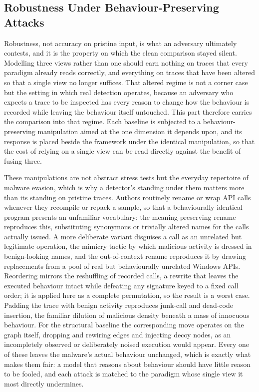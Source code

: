 \documentclass[%
    BCOR=10mm,
    DIV=13,
    toc=bibliography,
    toc=listof,
    oneside,
    12pt,
]{scrbook}
\begin{document}
\subsection{Robustness Under Behaviour-Preserving Attacks}
\label{subsec:baseline_failure_modes}

Robustness, not accuracy on pristine input, is what an adversary ultimately
contests, and it is the property on which the clean comparison stayed silent.
Modelling three views rather than one should earn nothing on traces that every
paradigm already reads correctly, and everything on traces that have been altered
so that a single view no longer suffices. That altered regime is not a corner case
but the setting in which real detection operates, because an adversary who expects
a trace to be inspected has every reason to change how the behaviour is recorded
while leaving the behaviour itself untouched. This part therefore carries the
comparison into that regime. Each baseline is subjected to a behaviour-preserving
manipulation aimed at the one
dimension it depends upon, and its response is placed beside the framework under
the identical manipulation, so that the cost of relying on a single view can be
read directly against the benefit of fusing three.

These manipulations are not abstract stress tests but the everyday repertoire of malware
evasion, which is why a detector's standing under them matters more than its
standing on pristine traces. Authors routinely rename or wrap API calls whenever
they recompile or repack a sample, so that a behaviourally identical program
presents an unfamiliar vocabulary; the meaning-preserving rename reproduces this,
substituting synonymous or trivially altered names for the calls actually issued.
A more deliberate variant disguises a call as an unrelated but legitimate
operation, the mimicry tactic by which malicious activity is dressed in
benign-looking names, and the out-of-context rename reproduces it by drawing
replacements from a pool of real but behaviourally unrelated Windows APIs.
Reordering mirrors the reshuffling of recorded calls, a rewrite that leaves the
executed behaviour intact while defeating any signature keyed to a fixed call
order; it is applied here as a complete permutation, so the result is a worst
case. Padding the trace with benign activity
reproduces junk-call and dead-code insertion, the familiar dilution of malicious
density beneath a mass of innocuous behaviour. For the structural baseline the
corresponding move operates on the graph itself, dropping and rewiring edges and
injecting decoy nodes, as an incompletely observed or deliberately noised
execution would appear. Every one of these leaves the malware's actual behaviour
unchanged, which is exactly what makes them fair: a model that reasons about
behaviour should have little reason to be fooled, and each attack is matched to the
paradigm whose single view it most directly undermines.
\end{document}
